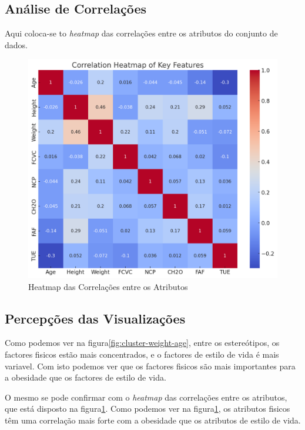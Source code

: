 \documentclass{easychair}
\begin{document}
\subsection{Análise de Correlações}

Aqui coloca-se to \textit{heatmap} das correlações entre os atributos do conjunto de dados.

\begin{figure}[ht]
  \centering
  \begin{minipage}
    {\linewidth}
    \includegraphics[width=\linewidth]{images/heatmap.jpg}
  \end{minipage}
  \caption{Heatmap das Correlações entre os Atributos}
  \label{fig:correlation-heatmap}
\end{figure}

\subsection{Percepções das Visualizações}

Como podemos ver na figura\ref{fig:cluster-weight-age}, entre os estereótipos, os factores fisicos estão mais concentrados, e o factores de estilo de vida é mais variavel. Com isto podemos ver que os factores fisicos são mais importantes para a obesidade que os factores de estilo de vida.

O mesmo se pode confirmar com o \textit{heatmap} das correlações entre os atributos, que está disposto na figura\ref{fig:correlation-heatmap}. Como podemos ver na figura\ref{fig:correlation-heatmap}, os atributos fisicos têm uma correlação mais forte com a obesidade que os atributos de estilo de vida.
\end{document}
